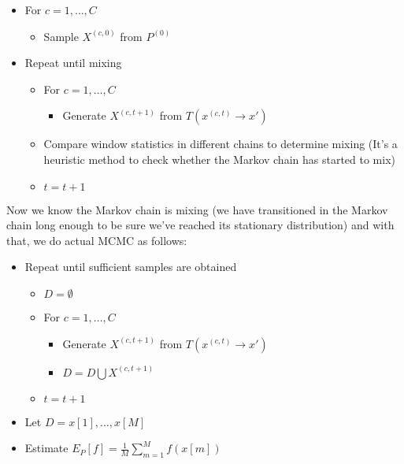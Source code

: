 \documentclass{article}
\begin{document}
    \begin{itemize}
        \item For $c=1, \ldots, C$
        \begin{itemize}
            \item Sample $X^{(c, 0)}$ from $P^{(0)}$
        \end{itemize}
        \item Repeat until mixing
        \begin{itemize}
            \item For $c=1, \ldots, C$
            \begin{itemize}
                \item Generate $X^{(c, t+1)}$ from $T(x^{(c, t)} \rightarrow x')$
            \end{itemize}
            \item Compare window statistics in different chains to determine mixing (It's a heuristic method to check whether the Markov chain has started to mix)
            \item $t=t+1$
        \end{itemize}
    \end{itemize}
    
    Now we know the Markov chain is mixing (we have transitioned in the Markov chain long enough to be sure we've reached its stationary distribution) and with that, we do actual MCMC as follows:
    
    \begin{itemize}
        \item Repeat until sufficient samples are obtained
        \begin{itemize}
            \item $D = \emptyset$
            \item For $c=1, \ldots, C$
            \begin{itemize}
                \item Generate $X^{(c, t+1)}$ from $T(x^{(c, t)} \rightarrow x')$
                \item $D = D \bigcup {X^{(c, t+1)}}$
            \end{itemize}
            \item $t = t+1$
        \end{itemize}
        \item Let $D = {x[1], \ldots, x[M]}$
        \item Estimate $E_P[f] = \frac{1}{M}\sum_{m=1}^M f(x[m])$
    \end{itemize}
\end{document}
